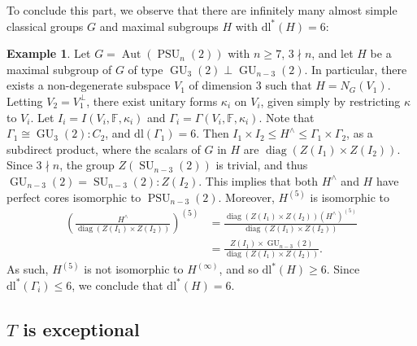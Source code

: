 \documentclass[11pt]{amsart}
\numberwithin{equation}{section}
\theoremstyle{definition}
\newtheorem{example}[theorem]{Example}
\theoremstyle{remark}
\newcommand{\Aut}{\mathop{\mathrm{Aut}}}
\newcommand{\PSU}{\mathop{\mathrm{PSU}}}
\newcommand{\dll}{\mathrm{dl^*}}
\newcommand{\dl}{\mathrm{dl}}
\DeclareMathOperator{\diag}{diag}
\DeclareMathOperator{\GU}{GU}
\DeclareMathOperator{\SU}{SU}
\begin{document}
To conclude this part, we observe that there are infinitely many almost simple classical groups $G$ and maximal subgroups $H$ with $\dll(H)=6$:

\begin{example}
    Let $G = \Aut(\PSU_n(2))$ with $n \geq 7$, $3 \nmid n$,
    and let $H$ be a maximal subgroup of $G$ of type $\GU_3(2) \perp \GU_{n-3}(2)$.
    In particular, there exists a non-degenerate subspace $V_1$ of dimension $3$ such that $H = N_G(V_1)$.
    Letting $V_2 = V_1^\perp$,
    there exist unitary forms $\kappa_i$ on $V_i$,
    given simply by restricting $\kappa$ to $V_i$.
    Let $I_i = I(V_i, \mathbb F, \kappa_i)$ and $\Gamma_i = \Gamma(V_i, \mathbb F, \kappa_i)$. Note that $\Gamma_1 \cong \GU_3(2):C_2$, and $\dl(\Gamma_1) = 6$.
    Then
    $I_1 \times I_2 \leqslant H^\wedge \leqslant \Gamma_1 \times \Gamma_2$,
    as a subdirect product,
    where the scalars of $G$ in $H$ are $\diag(Z(I_1) \times Z(I_2))$.
    Since $3 \nmid n$, the group $Z(\SU_{n-3}(2))$ is trivial, and thus $\GU_{n-3}(2) = \SU_{n-3}(2) : Z(I_2)$. This implies that both $H^\wedge$ and $H$ have perfect cores isomorphic to $\PSU_{n-3}(2)$. Moreover, $H^{(5)}$ is isomorphic to
    \begin{align*}
        \left( \frac{H^\wedge}{\diag(Z(I_1) \times Z(I_2))} \right)^{(5)} & = \frac{\diag(Z(I_1) \times Z(I_2)) (H^\wedge)^{(5)}}{\diag(Z(I_1) \times Z(I_2))}\\
        & = \frac{Z(I_1) \times \GU_{n-3}(2)}{\diag(Z(I_1) \times Z(I_2))}.
    \end{align*}
    As such, $H^{(5)}$ is not isomorphic to $H^{(\infty)}$, and so $\dll(H) \geq 6$. Since $\dll(\Gamma_i) \leq 6$, we conclude that $\dll(H) = 6$.
\end{example} 

\subsection{$T$ is exceptional} 
\end{document}
